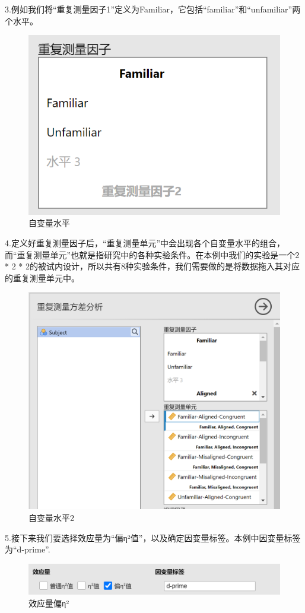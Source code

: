 \documentclass[]{ctexbook}
\theoremstyle{definition}
\theoremstyle{definition}
\theoremstyle{definition}
\theoremstyle{definition}
\theoremstyle{remark}
\begin{document}
3.例如我们将``重复测量因子1''定义为Familiar，它包括``familiar''和``unfamiliar''两个水平。

\begin{figure}

{\centering \includegraphics[width=0.4\linewidth]{img/jamovi/rmanova-factorlevels} 

}

\caption{自变量水平}\label{fig:jamovi-rmanova-factorlevels}
\end{figure}

4.定义好重复测量因子后，``重复测量单元''中会出现各个自变量水平的组合，而``重复测量单元''也就是指研究中的各种实验条件。在本例中我们的实验是一个2 * 2 * 2的被试内设计，所以共有8种实验条件，我们需要做的是将数据拖入其对应的重复测量单元中。

\begin{figure}

{\centering \includegraphics[width=0.6\linewidth]{img/jamovi/rmanova-factorlevels2} 

}

\caption{自变量水平2}\label{fig:jamovi-rmanova-factorlevels2}
\end{figure}

5.接下来我们要选择效应量为``偏η²值''，以及确定因变量标签。本例中因变量标签为``d-prime''.

\begin{figure}

{\centering \includegraphics[width=0.6\linewidth]{img/jamovi/rmanova-dv} 

}

\caption{效应量偏η²}\label{fig:jamovi-rmanova-dv}
\end{figure}
\end{document}
